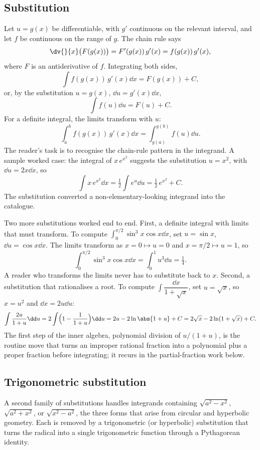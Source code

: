 \subsection{Substitution}

Let $u = g(x)$ be differentiable, with $g'$ continuous on the
relevant interval, and let $f$ be continuous on the range of $g$.
The chain rule says
\[
\dv{}{x}\bigl(F(g(x))\bigr) = F'(g(x))\,g'(x) = f(g(x))\,g'(x),
\]
where $F$ is an antiderivative of $f$. Integrating both sides,
\[
\int f(g(x))\,g'(x) \dd x = F(g(x)) + C,
\]
or, by the substitution $u = g(x)$, $\dd u = g'(x) \dd x$,
\[
\int f(u) \dd u = F(u) + C.
\]
For a definite integral, the limits transform with $u$:
\[
\int_{a}^{b} f(g(x))\,g'(x) \dd x = \int_{g(a)}^{g(b)} f(u) \dd u.
\]
The reader's task is to recognise the chain-rule pattern in the
integrand. A sample worked case: the integral of $x \, e^{x^{2}}$
suggests the substitution $u = x^{2}$, with $\dd u = 2x \dd x$, so
\[
\int x \, e^{x^{2}} \dd x =
\tfrac{1}{2}\int e^{u} \dd u = \tfrac{1}{2}\,e^{x^{2}} + C.
\]
The substitution converted a non-elementary-looking integrand into
the catalogue.

Two more substitutions worked end to end. First, a definite
integral with limits that must transform. To compute
$\int_{0}^{\pi/2}\sin^{3}x\cos x \dd x$, set $u = \sin x$, $\dd u =
\cos x \dd x$. The limits transform as $x = 0 \mapsto u = 0$ and
$x = \pi/2 \mapsto u = 1$, so
\[
\int_{0}^{\pi/2}\sin^{3}x \cos x \dd x = \int_{0}^{1} u^{3}\dd u =
\tfrac{1}{4}.
\]
A reader who transforms the limits never has to substitute back to
$x$. Second, a substitution that rationalises a root. To compute
$\int \dfrac{\dd x}{1 + \sqrt{x}}$, set $u = \sqrt{x}$, so
$x = u^{2}$ and $\dd x = 2u\dd u$:
\[
\int \frac{2u}{1 + u}\dd u = 2\int\Bigl(1 - \frac{1}{1+u}\Bigr)
\dd u = 2u - 2\ln\abs{1+u} + C = 2\sqrt{x} - 2\ln(1 + \sqrt{x})
+ C.
\]
The first step of the inner algebra, polynomial division of
$u/(1+u)$, is the routine move that turns an improper rational
fraction into a polynomial plus a proper fraction before
integrating; it recurs in the partial-fraction work below.

\subsection{Trigonometric substitution}

A second family of substitutions handles integrands containing
$\sqrt{a^{2} - x^{2}}$, $\sqrt{a^{2} + x^{2}}$, or $\sqrt{x^{2} -
a^{2}}$, the three forms that arise from circular and hyperbolic
geometry. Each is removed by a trigonometric (or hyperbolic)
substitution that turns the radical into a single trigonometric
function through a Pythagorean identity.

